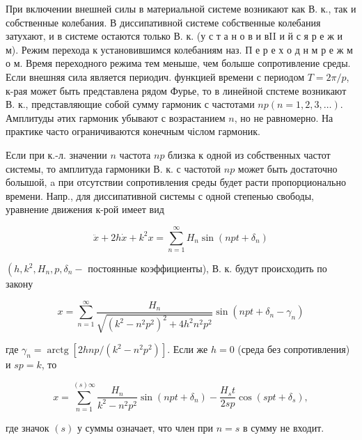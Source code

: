 \documentclass[10pt]{article}
\begin{document}
При включении внешней силы в материальной системе возникают как В. к., так и собственные колебания. В диссипативной системе собственные колебания затухают, и в системе остаются только В. к. (у с т а н о в и вII и й с я р е ж и м). Режим перехода к установившимся колебаниям наз. П е р е х о д н м р е ж м о м. Время переходного режима тем меныше, чем болыше сопротивление среды. Если внешняя сила является периодич. функцией времени с периодом $T=2 \pi / p$, к-рая может быть представлена рядом Фурье, то в линейной спстеме возникают В. к., представляющие собой сумму гармоник с частотами $n p(n=1,2,3, \ldots)$. Амплитуды әтих гармоник убывают с возрастанием $n$, но не равномерно. На практике часто ограничиваются конечным чіслом гармоник.



Если при к.-л. значении $n$ частота $n p$ близка к одной из собственных частот системы, то амплитуда гармоники В. к. с частотой $n p$ может быть достаточно болышой, a при отсутствии сопротивления среды будет расти пропорционально времени. Напр., для диссипативной системы с одной степенью свободы, уравнение движения к-рой имеет вид



\[

\ddot{x}+2 h \dot{x}+k^{2} x=\sum_{n=1}^{\infty} H_{n} \sin \left(n p t+\delta_{n}\right)

\]



$\left(h, k^{2}, H_{n}, p, \delta_{n}-\right.$ постоянные коэффициенты), В. к. будут происходить по закону



\[

x=\sum_{n=1}^{\infty} \frac{H_{n}}{\sqrt{\left(k^{2}-n^{2} p^{2}\right)^{2}+4 h^{2} n^{2} p^{2}}} \sin \left(n p t+\delta_{n}-\gamma_{n}\right)

\]



где $\gamma_{n}=\operatorname{arctg}\left[2 h n p /\left(k^{2}-n^{2} p^{2}\right)\right]$. Если же $h=0$ (среда без сопротивления) и $s p=k$, то



\[

x=\sum_{n=1}^{(s) \infty} \frac{H_{n}}{k^{2}-n^{2} p^{2}} \sin \left(n p t+\delta_{n}\right)-\frac{H_{s} t}{2 s p} \cos \left(s p t+\delta_{s}\right),

\]



где значок $(s)$ у суммы означает, что член при $n=s$ в сумму не входит.
\end{document}
